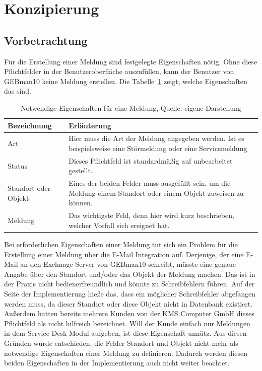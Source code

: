 \section{Konzipierung}

\subsection{Vorbetrachtung}
\noindent
Für die Erstellung einer Meldung sind festgelegte Eigenschaften nötig. Ohne diese Pflichtfelder in der Benutzeroberfläche auszufüllen, kann der Benutzer von GEBman10 keine Meldung erstellen. Die Tabelle~\ref{tab:Medlungseigenschaften} zeigt, welche Eigenschaften das sind. 

\begin{table}[h!]
    \begin{tabular}{ | l | p{11cm}|}
    \hline
    Bezeichnung & Erläuterung \\ \hline
 Art & Hier muss die Art der Meldung angegeben werden. Ist es beispielsweise eine Störmeldung oder eine Servicemeldung \\ \hline
 Status & Dieses Pflichtfeld ist standardmäßig auf unbearbeitet gestellt.  \\ \hline
Standort oder Objekt & Eines der beiden Felder muss ausgefüllt sein, um die Meldung einem Standort oder einem Objekt zuweisen zu können. \\ \hline
Meldung & Das wichtigste Feld, denn hier wird kurz beschrieben, welcher Vorfall sich ereignet hat. \\ \hline
    \end{tabular}
    \caption{Notwendige Eigenschaften für eine Meldung, Quelle: eigene Darstellung}
    \label{tab:Medlungseigenschaften}
\end{table}

\noindent
Bei erforderlichen Eigenschaften einer Meldung tut sich ein Problem für die Erstellung einer Meldung über die E-Mail Integration auf. Derjenige, der eine E-Mail an den Exchnage Server von GEBman10 schreibt, müsste eine genaue Angabe über den Standort und/oder das Objekt der Meldung machen. Das ist in der Praxis nicht bedienerfreundlich und könnte zu Schreibfehlern führen. Auf der Seite der Implementierung hieße das, dass ein möglicher Schreibfehler abgefangen werden muss, da dieser Standort oder diese Objekt nicht in Datenbank existiert. Außerdem hatten bereits mehrere Kunden von der KMS Computer GmbH dieses Pflichtfeld als nicht hilfreich bezeichnet. Will der Kunde einfach nur Meldungen in dem Service Desk Modul aufgeben, ist diese Eigenschaft unnütz. Aus diesen Gründen wurde entschieden, die Felder Standort und Objekt nicht mehr als notwendige Eigenschaften einer Meldung zu definieren. Dadurch werden diesen beiden Eigenschaften in der Implementierung auch nicht weiter beachtet.

